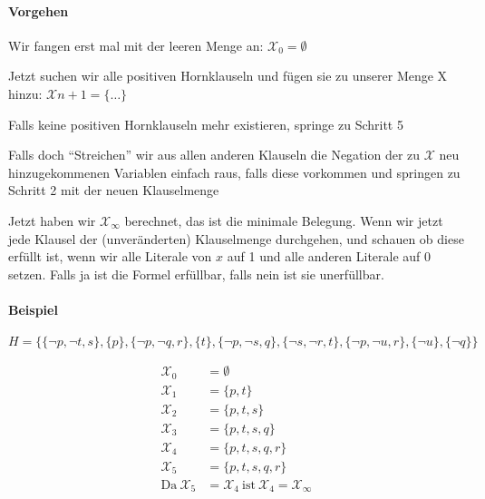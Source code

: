 \documentclass[
    ngerman,
    color=3b,
    summary,
    boxarc,
    main,
    fleqn,
    leqno,
]{rubos-tuda-template}
\begin{document}
    \paragraph{Vorgehen}
    \begin{steps}
        \item Wir fangen erst mal mit der leeren Menge an: $\mathcal{X}_0=\emptyset$
        \item Jetzt suchen wir alle positiven Hornklauseln und fügen sie zu unserer Menge X hinzu: $\mathcal{X}{n+1}=\{\dots\}$
        \item Falls keine positiven Hornklauseln mehr existieren, springe zu Schritt 5
        \item Falls doch \enquote{Streichen} wir aus allen anderen Klauseln die Negation der zu $\mathcal{X}$ neu hinzugekommenen Variablen einfach raus, falls diese vorkommen und springen zu Schritt 2 mit der neuen Klauselmenge
        \item Jetzt haben wir $\mathcal{X}_\infty$ berechnet, das ist die minimale Belegung. Wenn wir jetzt jede Klausel der (unveränderten) Klauselmenge durchgehen, und schauen ob diese erfüllt ist, wenn wir alle Literale von $x$ auf 1 und alle anderen Literale auf $0$ setzen. Falls ja ist die Formel erfüllbar, falls nein ist sie unerfüllbar.
    \end{steps}
    \paragraph{Beispiel}\mbox{}

    $H = \{\{\lnot p, \lnot t, s\}, \{p\}, \{\lnot p, \lnot q, r\}, \{t\}, \{\lnot p, \lnot s, q\}, \{\lnot s, \lnot r, t\}, \{\lnot p, \lnot u, r\}, \{\lnot u\}, \{\lnot q\}\}$
    \begin{ceqn}
        \begin{align*}
            \mathcal{X}_0             & = \emptyset                                                      \\
            \mathcal{X}_1             & = \{p, t\}                                                       \\
            \mathcal{X}_2             & = \{p, t, s\}                                                    \\
            \mathcal{X}_3             & = \{p, t, s, q\}                                                 \\
            \mathcal{X}_4             & = \{p, t, s, q, r\}                                              \\
            \mathcal{X}_5             & = \{p, t, s, q, r\}                                              \\
            \mathrm{Da}~\mathcal{X}_5 & = \mathcal{X}_4 ~\mathrm{ist}~\mathcal{X}_4 = \mathcal{X}_\infty
        \end{align*}
    \end{ceqn}
\end{document}
